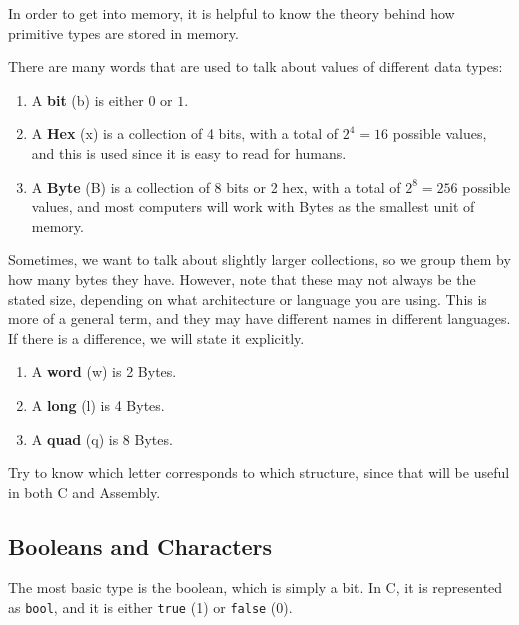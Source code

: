 \documentclass{article}
\begin{document}
  In order to get into memory, it is helpful to know the theory behind how primitive types are stored in memory.  

  \begin{definition}
    There are many words that are used to talk about values of different data types: 
    \begin{enumerate}
      \item A \textbf{bit} (b) is either $0$ or $1$. 
      \item A \textbf{Hex} (x) is a collection of 4 bits, with a total of $2^4 = 16$ possible values, and this is used since it is easy to read for humans. 
      \item A \textbf{Byte} (B) is a collection of 8 bits or 2 hex, with a total of $2^8 = 256$ possible values, and most computers will work with Bytes as the smallest unit of memory. 
    \end{enumerate}
  \end{definition}

  \begin{definition}
    Sometimes, we want to talk about slightly larger collections, so we group them by how many bytes they have. However, note that these may not always be the stated size, depending on what architecture or language you are using. This is more of a general term, and they may have different names in different languages. If there is a difference, we will state it explicitly. 
    \begin{enumerate}
      \item A \textbf{word} (w) is 2 Bytes. 
      \item A \textbf{long} (l) is 4 Bytes. 
      \item A \textbf{quad} (q) is 8 Bytes. 
    \end{enumerate} 
    Try to know which letter corresponds to which structure, since that will be useful in both C and Assembly. 
  \end{definition}

  \subsection{Booleans and Characters} 

    \begin{definition}[Booleans in C]
      The most basic type is the boolean, which is simply a bit. In C, it is represented as \texttt{bool}, and it is either \texttt{true} (1) or \texttt{false} (0). 
    \end{definition}
\end{document}
